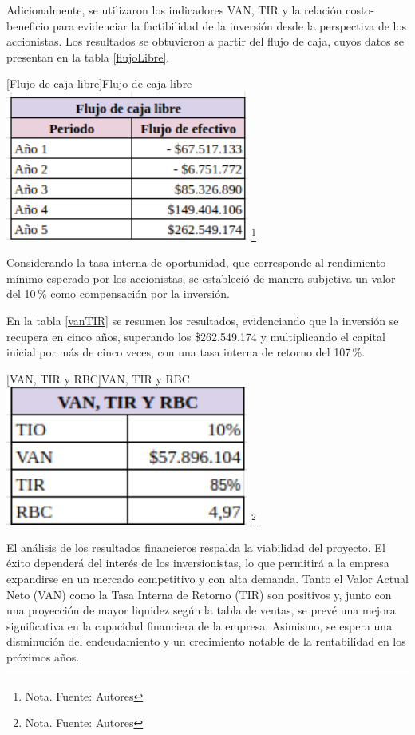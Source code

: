 Adicionalmente, se utilizaron los indicadores VAN, TIR y la relación costo-beneficio para evidenciar la factibilidad de la inversión desde la perspectiva de los accionistas. Los resultados se obtuvieron a partir del flujo de caja, cuyos datos se presentan en la tabla \ref{flujoLibre}.

\vspace{2mm}
\begin{minipage}{0.9\textwidth}
\centering
{}[{Flujo de caja libre}]{Flujo de caja libre}
\label{flujoLibre}
\includegraphics[width=0.6\textwidth]{Content/Images/AF/FlujoDeCajaLibre.png}
\footnote{Nota. \textup{Fuente: Autores}}
\end{minipage}

Considerando la tasa interna de oportunidad, que corresponde al rendimiento mínimo esperado por los accionistas, se estableció de manera subjetiva un valor del 10\,\% como compensación por la inversión.

En la tabla \ref{vanTIR} se resumen los resultados, evidenciando que la inversión se recupera en cinco años, superando los \$262.549.174 y multiplicando el capital inicial por más de cinco veces, con una tasa interna de retorno del 107\,\%.

\vspace{2mm}
\begin{minipage}{0.9\textwidth}
\centering
{}[{VAN, TIR y RBC}]{VAN, TIR y RBC}
\label{vanTIR}
\includegraphics[width=0.6\textwidth]{Content/Images/AF/VanTirRbc.png}
\footnote{Nota. \textup{Fuente: Autores}}
\end{minipage}

El análisis de los resultados financieros respalda la viabilidad del proyecto. El éxito dependerá del interés de los inversionistas, lo que permitirá a la empresa expandirse en un mercado competitivo y con alta demanda. Tanto el Valor Actual Neto (VAN) como la Tasa Interna de Retorno (TIR) son positivos y, junto con una proyección de mayor liquidez según la tabla de ventas, se prevé una mejora significativa en la capacidad financiera de la empresa. Asimismo, se espera una disminución del endeudamiento y un crecimiento notable de la rentabilidad en los próximos años.

